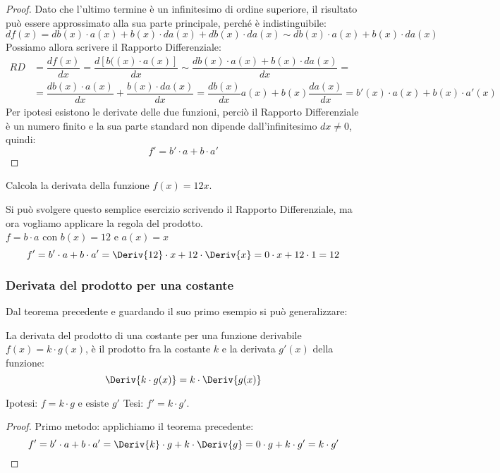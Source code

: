 \begin{proof}
Dato che l'ultimo termine è un infinitesimo di ordine
superiore, il risultato può essere approssimato alla sua parte principale, 
perché è indistinguibile:
\[df(x) = db(x)\cdot a(x) + b(x)\cdot da(x) + db(x)\cdot da(x)
                 \sim db(x)\cdot a(x)+b(x)\cdot da(x)\]
Possiamo allora scrivere il Rapporto Differenziale:
\begin{align*}
RD& = \dfrac{df(x)}{dx}=\dfrac{d[b((x)\cdot a(x)]}{dx} \sim 
      \dfrac{db(x)\cdot a(x)+b(x)\cdot da(x)}{dx}=\\
&=\dfrac{db(x)\cdot a(x)}{dx}+\dfrac{b(x)\cdot da(x)}{dx}=
\dfrac{db(x)}{dx} a(x)+b(x)\dfrac{da(x)}{dx} =
b'(x) \cdot a(x) + b(x) \cdot a'(x)
\end{align*}
Per ipotesi esistono le derivate delle due funzioni, perciò 
il Rapporto Differenziale è un numero finito e la sua parte standard non 
dipende dall'infinitesimo \(dx \neq 0\), quindi:
\[f' = b' \cdot a + b \cdot a'\]
\end{proof}

\begin{esempio}
\label{esem:diff_prodottocostante}
Calcola la derivata della funzione \(f(x)=12x\).

Si può svolgere questo semplice esercizio scrivendo il Rapporto 
Differenziale, ma ora vogliamo applicare la regola del prodotto.\\
\(f = b \cdot a\) \quad con \(b(x) = 12\) e \(a(x) = x\)
\[f' = b' \cdot a + b \cdot a' = 
\Deriv{12} \cdot x + 12 \cdot \Deriv{x} =
0 \cdot x + 12\cdot 1 = 12\]
\end{esempio}
% 
% 

\subsubsection{Derivata del prodotto per una costante}
\label{subsubsec:derivata_f_per_k}

Dal teorema precedente e guardando il suo primo esempio si può 
generalizzare:
\begin{teorema}
La derivata del prodotto di una costante per una funzione derivabile
\(f(x) = k \cdot g(x)\), è il prodotto fra la 
costante \(k\) e la derivata \(g'(x)\) della funzione: 
\[\Deriv{k \cdot g(x)} =k \cdot \Deriv{g(x)}\]
\end{teorema}
\noindent Ipotesi: \(f = k \cdot g \text{ e esiste } g'\)
\tab Tesi: \(f' = k \cdot g'\). 
\begin{proof}
Primo metodo: applichiamo il teorema precedente:
\[f' = b' \cdot a + b \cdot a' = 
\Deriv{k} \cdot g + k \cdot \Deriv{g} =
0 \cdot g + k\cdot g' = k \cdot g'\]
\end{proof}

